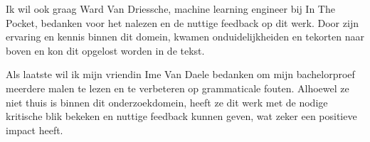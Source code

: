 Ik wil ook graag Ward Van Driessche, machine learning engineer bij In The Pocket, bedanken voor het nalezen en de nuttige feedback op dit werk. Door zijn ervaring en kennis binnen dit domein, kwamen onduidelijkheiden en tekorten naar boven en kon dit opgelost worden in de tekst. 

Als laatste wil ik mijn vriendin Ime Van Daele bedanken om mijn bachelorproef meerdere malen te lezen en te verbeteren op grammaticale fouten. Alhoewel ze niet thuis is binnen dit onderzoekdomein, heeft ze dit werk met de nodige kritische blik bekeken en nuttige feedback kunnen geven, wat zeker een positieve impact heeft.
